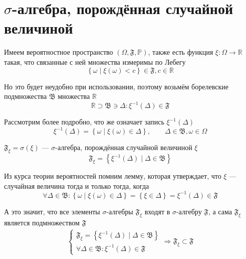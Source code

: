 \section{$\sigma$-алгебра, порождённая случайной величиной}
Имеем вероятностное пространство
$\left( \Omega, \mathfrak{F}, \mathbb{P} \right)$,
также есть функция $\xi: \Omega\rightarrow\mathbb{R}$
такая, что связанные с ней множества измеримы по Лебегу
$$\left\{\omega
    \mid \xi\left(\omega\right) < c\right\} \in \mathfrak{F}, c\in \mathbb{R}$$

Но это будет неудобно при использовании,
поэтому возьмём борелевские подмножества $\mathfrak{B}$ множества $\mathbb{R}$
$$\mathbb{R}\supset\mathfrak{B}\ni\Delta:
    \xi^{-1}\left( \Delta \right) \in \mathfrak{F}$$

Рассмотрим более подробно,
что же означает запись $\xi^{-1}\left( \Delta \right)$
$$\xi^{-1}\left( \Delta \right)
    = \left\{ \omega \mid \xi\left( \omega \right) \in \Delta \right\},
    \qquad \Delta\in\mathfrak{B}, \omega\in\Omega$$

\begin{definition}
    $\mathfrak{F}_\xi = \sigma\left( \xi \right)$
    --- $\sigma$-алгебра, порождённая случайной величиной $\xi$
    $$\mathfrak{F}_\xi
        =\left\{ \xi^{-1}\left( \Delta \right)
            \mid \Delta\in\mathfrak{B} \right\}$$
\end{definition}

Из курса теории вероятностей помним лемму, которая утверждает,
что $\xi$ --- случайная величина тогда и только тогда, когда
$$\forall\Delta\in\mathfrak{B}:
    \left\{ \omega \mid \xi\left( \omega \right) \in \Delta \right\}
    = \left\{ \xi\in\Delta \right\}
    = \xi^{-1}\left( \Delta \right) \in \mathfrak{F}$$

А это значит, что все элементы $\sigma$-алгебры $\mathfrak{F}_\xi$
входят в $\sigma$-алгебру $\mathfrak{F}$, а сама $\mathfrak{F}_\xi$
является подмножеством $\mathfrak{F}$
\begin{align*}
    \begin{cases}
        \mathfrak{F}_\xi
            = \left\{ \xi^{-1}\left( \Delta \right)
                \mid \Delta\in\mathfrak{B} \right\}\\
        \forall\Delta\in\mathfrak{B}:
            \xi^{-1}\left( \Delta \right) \in \mathfrak{F}
    \end{cases}
    \Rightarrow
    \mathfrak{F}_\xi \subset \mathfrak{F}
\end{align*}

